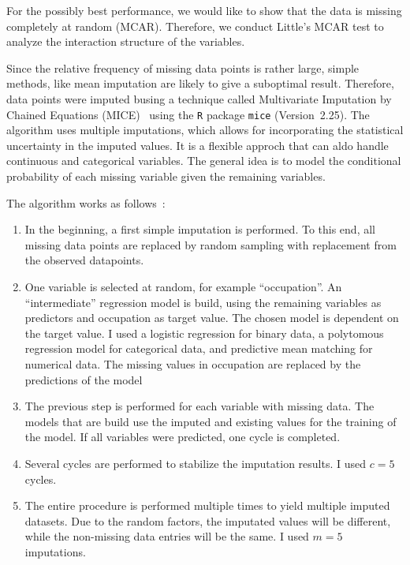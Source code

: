 \documentclass{article}
\begin{document}
For the possibly best performance, we would like to show that the data
is missing completely at random (MCAR). Therefore, we conduct Little's
MCAR test \cite{little1988test} to analyze the interaction structure
of the variables.

Since the relative frequency of missing data points is rather large,
simple methods, like mean imputation are likely to give a suboptimal
result. Therefore, data points were imputed busing a technique called
Multivariate Imputation by Chained Equations
(MICE)~\cite{buuren2011mice} using the \texttt{R} package
\texttt{mice} (Version~2.25). The algorithm uses multiple imputations,
which allows for incorporating the statistical uncertainty in the
imputed values. It is a flexible approch that can aldo handle
continuous and categorical variables. The general idea is to model the
conditional probability of each missing variable given the remaining
variables.

The algorithm works as follows~\cite{azur2011multiple}:
\begin{enumerate}
\item In the beginning, a first simple imputation is performed. To
  this end, all missing data points are replaced by random sampling
  with replacement from the observed datapoints.
\item One variable is selected at random, for example
  ``occupation''. An ``intermediate'' regression model is build, using
  the remaining variables as predictors and occupation as target
  value. The chosen model is dependent on the target value. I used a
  logistic regression for binary data, a polytomous regression model
  for categorical data, and predictive mean matching for numerical
  data. The missing values in occupation are replaced by the
  predictions of the model
\item The previous step is performed for each variable with missing
  data. The models that are build use the imputed and existing values
  for the training of the model. If all variables were predicted, one
  cycle is completed.
\item Several cycles are performed to stabilize the imputation
  results. I used $c = 5$ cycles.
\item The entire procedure is performed multiple times to yield
  multiple imputed datasets. Due to the random factors, the imputated
  values will be different, while the non-missing data entries will be
  the same. I used $m = 5$ imputations.
\end{enumerate}
\end{document}
